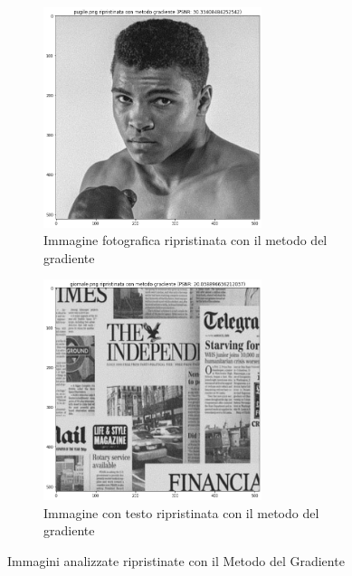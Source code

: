 \begin{figure}[H]
    \begin{subfigure}{0.3\textwidth}
        \centering
    \includegraphics[width=0.7\textwidth]{imgRel/fotogrmg.png}
    \caption{Immagine fotografica ripristinata con il metodo del gradiente}
    \label{fig:pugilegradiente}
    \end{subfigure}%
    \begin{subfigure}{0.3\textwidth}\centering
        \includegraphics[width=0.7\textwidth]{imgRel/giornalemg.png}
        \caption{Immagine con testo ripristinata con il metodo del gradiente}
    \end{subfigure}
\caption{Immagini analizzate ripristinate con il Metodo del Gradiente}
    \centering

\end{figure}
